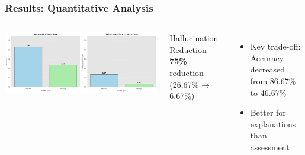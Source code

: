 \documentclass{beamer}
\begin{document}
\begin{frame}
\frametitle{Results: Quantitative Analysis}

\begin{columns}
\begin{center}
\includegraphics[width=\textwidth]{../results_final/model_comparison.png}
\end{center}

\begin{alertblock}{Hallucination Reduction}  
\textbf{75\%} reduction (26.67\% → 6.67\%)
\end{alertblock}

\begin{itemize}
    \item \alert{Key trade-off}: Accuracy decreased from 86.67\% to 46.67\%
    \item Better for explanations than assessment
\end{itemize}
\end{columns}
\end{frame}
\end{document}
